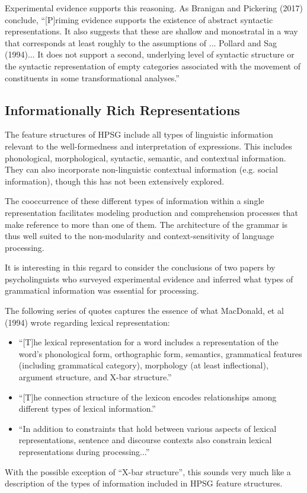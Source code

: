 \documentclass[a4paper]{article}
\begin{document}
Experimental evidence supports this reasoning.  As Branigan and Pickering (2017) conclude, ``[P]riming evidence supports the existence of
abstract syntactic representations. It also suggests that
these are shallow and monostratal in a way that corresponds
at least roughly to the assumptions of ... Pollard and
Sag (1994)... It does not support a second,
underlying level of syntactic structure or the syntactic representation
of empty categories associated with the movement
of constituents in some transformational analyses.''
\subsection{Informationally Rich Representations}

The feature structures of HPSG include all
types of linguistic information relevant to the well-formedness and interpretation
of expressions. This includes phonological, morphological, syntactic, semantic, and contextual information.  They can also incorporate non-linguistic contextual information (e.g. social information), though this has not been extensively explored.

The cooccurrence of these different types of information within a single representation facilitates modeling production and comprehension processes that make reference to more than one of them.  The architecture of the grammar is thus well suited to the non-modularity and context-sensitivity of language processing.  

It is interesting in this regard to consider the conclusions of two papers by psycholinguists who surveyed experimental evidence and inferred what types of grammatical information was essential for processing.  

The following series of quotes captures the essence of what MacDonald, et al (1994) wrote regarding lexical representation:
\begin{itemize} 
\item ``[T]he lexical
representation for a word includes a representation of the
word's phonological form, orthographic form, semantics,
grammatical features (including grammatical category), morphology
(at least inflectional), argument structure, and X-bar
structure.''
\item ``[T]he connection
structure of the lexicon encodes relationships among
different types of lexical information.''
\item
``In addition to constraints that hold between various aspects
of lexical representations, sentence and discourse contexts also
constrain lexical representations during processing...''
\end{itemize}
With the possible exception of ``X-bar structure'', this sounds very much like a description of the types of information included in HPSG feature structures.
\end{document}
